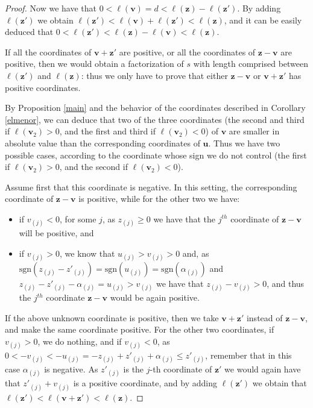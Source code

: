 \documentclass[11pt]{amsart}
\theoremstyle{remark}
\begin{document}
\begin{proof}
Now we have that $0<\ell(\mathbf v)=d<\ell(\mathbf z)-\ell(\mathbf z')$. By adding $\ell(\mathbf z')$ we obtain $\ell(\mathbf z')<\ell(\mathbf v)+\ell(\mathbf z')<\ell(\mathbf z)$, and it can be easily deduced that $0<\ell(\mathbf z')<\ell(\mathbf z)-\ell(\mathbf v)<\ell(\mathbf z)$.
 
If all the coordinates of $\mathbf v+\mathbf z'$ are positive, or all the coordinates of $\mathbf z-\mathbf v$ are positive, then we would obtain a factorization of $s$ with length comprised between $\ell(\mathbf z')$ and $\ell(\mathbf z)$: thus we only have to prove that either $\mathbf z-\mathbf v$ or $\mathbf v+\mathbf z'$ has positive coordinates. 
 
By Proposition \ref{main} and the behavior of the coordinates described in Corollary \ref{elmenor}, we can deduce that two of the three coordinates (the second and third if $\ell(\mathbf v_2)>0$, and the first and third if $\ell(\mathbf v_2)<0$) of $\mathbf v$ are smaller in absolute value than the corresponding coordinates of $\mathbf u$. Thus we have two possible cases, according to the coordinate whose sign we do not control (the first if $\ell(\mathbf v_2)>0$, and the second if $\ell(\mathbf v_2)<0$).
 
Assume first that this coordinate is negative. In this setting, the corresponding coordinate of  $\mathbf z-\mathbf v$ is positive, while for the other two we have:
  \begin{itemize}
  \item if $v_{(j)}<0$, for some $j$, as $z_{(j)}\ge 0$ we have that the $j^{th}$ coordinate of $\mathbf z-\mathbf v$ will be positive, and
  \item if  $v_{(j)}>0$, we know that $u_{(j)}> v_{(j)}>0$ and, as $\mathrm{sgn}(z_{(j)}-z'_{(j)})=\mathrm{sgn}(u_{(j)})=\mathrm{sgn}(\alpha_{(j)})$ and $z_{(j)}-z'_{(j)}-\alpha_{(j)}=u_{(j)}>v_{(j)}$ we have that $z_{(j)}-v_{(j)}>0$, and thus the $j^{th}$ coordinate $\mathbf z-\mathbf v$ would be again positive.
  \end{itemize}  
 
If the above unknown coordinate is positive, then we take $\mathbf v+\mathbf z'$ instead of $\mathbf z-\mathbf v$, and make the same coordinate positive. For the other two coordinates, if $v_{(j)}>0$, we do nothing, and if $v_{(j)}<0$, as $0<-v_{(j)}<-u_{(j)}=-z_{(j)}+z'_{(j)}+\alpha_{(j)}\le z'_{(j)}$, remember that in this case $\alpha_{(j)}$ is negative. As $z'_{(j)}$ is the $j$-th coordinate of $\mathbf z'$ we would again have that $z'_{(j)}+v_{(j)}$ is a positive coordinate, and by adding $\ell(\mathbf z')$ we obtain that $\ell(\mathbf z')<\ell(\mathbf v+\mathbf z')<\ell(\mathbf z)$. 
\end{proof}
\end{document}

